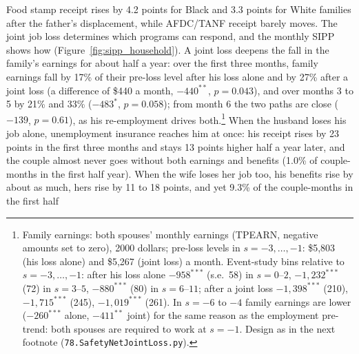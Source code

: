 Food stamp receipt rises by 4.2 points for Black and 3.3 points for White families after the father's displacement,
while AFDC/TANF receipt barely moves. The joint job loss determines which programs can respond, and the monthly SIPP
shows how (Figure~\ref{fig:sipp_household}). A joint loss deepens the fall in the family's earnings for about half a
year: over the first three months, family earnings fall by 17\% of their pre-loss level after his loss alone and by
27\% after a joint loss (a difference of \$440 a month, $-440^{**}$, $p=0.043$), and over months 3 to 5 by 21\% and
33\% ($-483^{*}$, $p=0.058$); from month 6 the two paths are close ($-139$, $p=0.61$), as his re-employment drives
both.\footnote{Family earnings: both spouses' monthly earnings (TPEARN, negative amounts set to zero), 2000 dollars;
pre-loss levels in $s=-3,\dots,-1$: \$5,803 (his loss alone) and \$5,267 (joint loss) a month. Event-study bins
relative to $s=-3,\dots,-1$: after his loss alone $-958^{***}$ (s.e.\ 58) in $s=0$--$2$, $-1{,}232^{***}$ (72) in
$s=3$--$5$, $-880^{***}$ (80) in $s=6$--$11$; after a joint loss $-1{,}398^{***}$ (210), $-1{,}715^{***}$ (245),
$-1{,}019^{***}$ (261). In $s=-6$ to $-4$ family earnings are lower ($-260^{***}$ alone, $-411^{**}$ joint) for the
same reason as the employment pre-trend: both spouses are required to work at $s=-1$. Design as in the next footnote
(\texttt{78.SafetyNetJointLoss.py}).} When the husband loses his job alone, unemployment insurance reaches him at once: his receipt rises by 23
points in the first three months and stays 13 points higher half a year later, and the couple almost never goes
without both earnings and benefits (1.0\% of couple-months in the first half year). When the wife loses her job too,
his benefits rise by about as much, hers rise by 11 to 18 points, and yet 9.3\% of the couple-months in the first half
